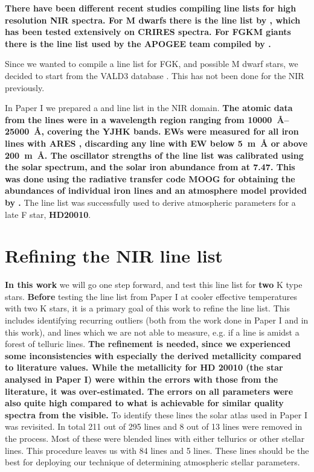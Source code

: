 \documentclass{aa}
\begin{document}
{\bf There have been different recent studies compiling line lists for high
resolution NIR spectra. For M dwarfs there is the line list by
\citet{Onehag2012,Lindgren2016}, which has been tested extensively on CRIRES
spectra. For FGKM giants there is the line list used by the APOGEE team compiled
by \citet{Shetrone2015}.

Since we wanted to compile a line list for FGK, and possible M dwarf stars, we
decided to start from the VALD3 database \citep{VALD1,VALD2}. This has not been
done for the NIR previously.} In Paper I we prepared a  and
 line list in the NIR domain. {\bf The atomic data from the lines
were in a wavelength region ranging from \SIrange{10000}{25000}{\AA}, covering
the YJHK bands. EWs were measured for all iron lines with ARES
\citep{Sousa2015a}, discarding any line with EW below \SI{5}{m\AA} or above
\SI{200}{m\AA}. The oscillator strengths of the line list was calibrated using
the solar spectrum, and the solar iron abundance from \citet{Gonzalez2000} at
7.47. This was done using the radiative transfer code MOOG \citep{Sneden1973}
for obtaining the abundances of individual iron lines and an atmosphere model
provided by \citet{Kurucz1993}.} The line list was successfully used to derive
atmospheric parameters for a late F star, {\bf HD20010}.


\section{Refining the NIR line list}
\label{sec:refining_the_line_list}

{\bf In this work} we will go one step forward, and test this line list for {\bf
two} K type stars. {\bf Before} testing the line list from Paper I at cooler
effective temperatures with two K stars, it is a primary goal of this work to
refine the line list. This includes identifying recurring outliers (both from
the work done in Paper I and in this work), and lines which we are not able to
measure, e.g. if a line is amidst a forest of telluric lines. {\bf The
refinement is needed, since we experienced some inconsistencies with especially
the derived metallicity compared to literature values. While the metallicity for
HD 20010 (the star analysed in Paper I) were within the errors with those from
the literature, it was over-estimated. The errors on all parameters were also
quite high compared to what is achievable for similar quality spectra from the
visible.} To identify these lines the solar atlas used in Paper I was revisited.
In total 211 out of 295  lines and 8 out of 13  lines
were removed in the process. Most of these were blended lines with either
tellurics or other stellar lines. This procedure leaves us with 84 
lines and 5  lines. These lines should be the best for deploying our
technique of determining atmospheric stellar parameters.
\end{document}
